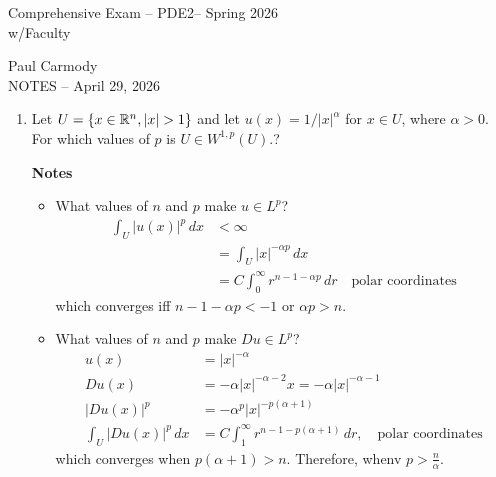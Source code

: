 \documentclass[12pt,a4paper]{report}
\newcommand{\CLASSNAME}{Comprehensive Exam -- PDE2}
\newcommand{\STUDENTNAME}{Paul Carmody}
\newcommand{\ASSIGNMENT}{NOTES }
\newcommand{\DUEDATE}{April 29, 2026}
\newcommand{\SEMESTER}{Spring 2026}
\begin{document}
\begin{center}
	\Large{\CLASSNAME -- \SEMESTER} \\
	\large{ w/Faculty}
\end{center}
\begin{center}
	\STUDENTNAME \\
	\ASSIGNMENT -- \DUEDATE\\
\end{center} 

\begin{enumerate}

\item Let $U = \{x\in \mathbb{R}^n, |x| > 1\}$ and let $u(x) = 1/|x|^\alpha$ for $x \in U$, where $\alpha > 0$.  For which values of $p$ is $U \in W^{1,p}(U)$.?

\HLINE
\textbf{Notes}

\HLINE
\begin{itemize}
	\item What values of $n$ and $p$ make $u \in L^p$?
\begin{align*}
	\int_U |u(x)|^p\,dx &< \infty \\
		&= \int_U|x|^{-\alpha p} \, dx\\
		&= C \int_0^\infty r^{n-1-\alpha p}\,dr\quad\text{polar coordinates}
\end{align*}which converges iff $n-1-\alpha p < -1$ or $\alpha p > n$.
	\item What values of $n$ and $p$ make $Du \in L^p$?
	\begin{align*}
		u(x) &= |x|^{-\alpha} \\
		Du(x) &=  -\alpha|x|^{-\alpha-2}x =  -\alpha|x|^{-\alpha-1}  \\
		|Du(x)|^p &=  -\alpha^p|x|^{-p(\alpha+1)}  \\
		\int_U |Du(x)|^p\,dx &= C\int_1^\infty r^{n-1-p(\alpha+1)}\,dr,\quad\text{polar coordinates}
	\end{align*}which converges when $p(\alpha+1)>n$. Therefore, whenv $p> \frac{n}{\alpha}$.
\end{itemize}


\end{enumerate}
\end{document}
